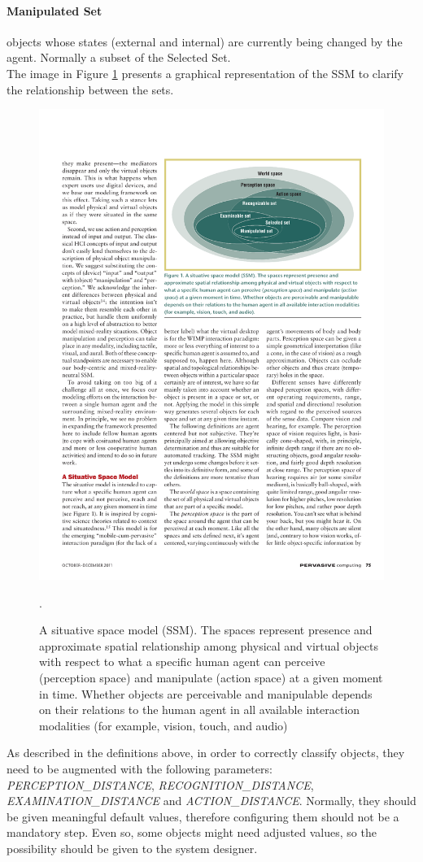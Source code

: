 \paragraph{Manipulated Set} objects whose states (external and internal) are currently being changed by the agent. Normally a subset of the Selected Set.\\

The image in Figure \ref{fig:req_ssm_sets} presents a graphical representation of the SSM to clarify the relationship between the sets.
\begin{figure}[H]
	\centering
	\includegraphics[width=\linewidth]{gfx/Chapter3/ssm_sets}
	\caption{A situative space model (SSM). The spaces represent presence and approximate spatial relationship among physical and virtual objects with respect to what a specific human agent can perceive (perception space) and manipulate (action space) at a given moment in time. Whether objects are perceivable and manipulable depends on their relations to the human agent in all available interaction modalities (for example, vision, touch, and audio) \cite{pederson2011situative}}.
	\label{fig:req_ssm_sets}
\end{figure}

As described in the definitions above, in order to correctly classify objects, they need to be augmented with the following parameters: \emph{PERCEPTION\_DISTANCE}, \emph{RECOGNITION\_DISTANCE}, \emph{EXAMINATION\_DISTANCE} and \emph{ACTION\_DISTANCE}. Normally, they should be given meaningful default values, therefore configuring them should not be a mandatory step. Even so, some objects might need adjusted values, so the possibility should be given to the system designer.
